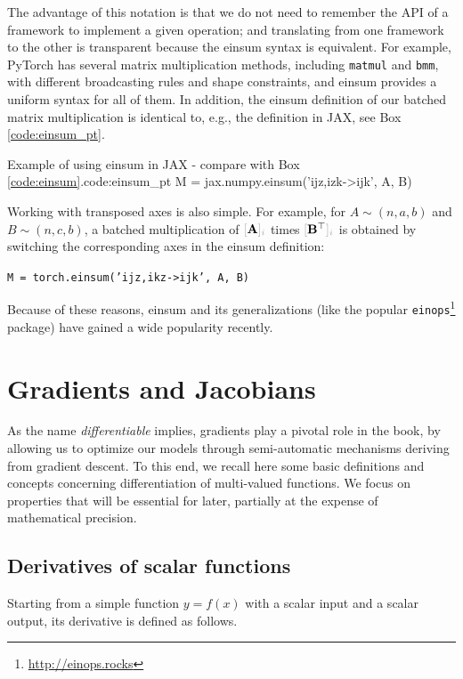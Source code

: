The advantage of this notation is that we do not need to remember the API of a framework to implement a given operation; and translating from one framework to the other is transparent because the einsum syntax is equivalent. For example, PyTorch has several matrix multiplication methods, including {\footnotesize\verb+matmul+} and {\footnotesize\verb+bmm+}, with different broadcasting rules and shape constraints, and einsum provides a uniform syntax for all of them. In addition, the einsum definition of our batched matrix multiplication is identical to, e.g., the definition in JAX, see Box \ref{code:einsum_pt}.

\begin{mypy}{Example of using einsum in JAX - compare with Box \ref{code:einsum}.}{code:einsum_pt}
M = jax.numpy.einsum('ijz,izk->ijk', A, B)
\end{mypy}
%
Working with transposed axes is also simple. For example, for $A \sim (n,a,b)$ and $B \sim (n, c, b)$, a batched multiplication of $\idx{\mathbf{A}}{i}$ times $\idx{\mathbf{B}^\top}{i}$ is obtained by switching the corresponding axes in the einsum definition:

{\footnotesize
\noindent\texttt{M = torch.einsum('ijz,ikz->ijk', A, B)}
}

\noindent Because of these reasons, einsum and its generalizations (like the popular {\footnotesize\verb+einops+}\footnote{\url{http://einops.rocks}} package) have gained a wide popularity recently.

\section{Gradients and Jacobians}
\label{sec:gradients_and_jacobians}

As the name \textit{differentiable} implies, gradients play a pivotal role in the book, by allowing us to optimize our models through semi-automatic mechanisms deriving from gradient descent. To this end, we recall here some basic definitions and concepts concerning differentiation of multi-valued functions. We focus on properties that will be essential for later, partially at the expense of mathematical precision.

\subsection{Derivatives of scalar functions}

Starting from a simple function $y=f(x)$ with a scalar input and a scalar output, its derivative is defined as follows.

